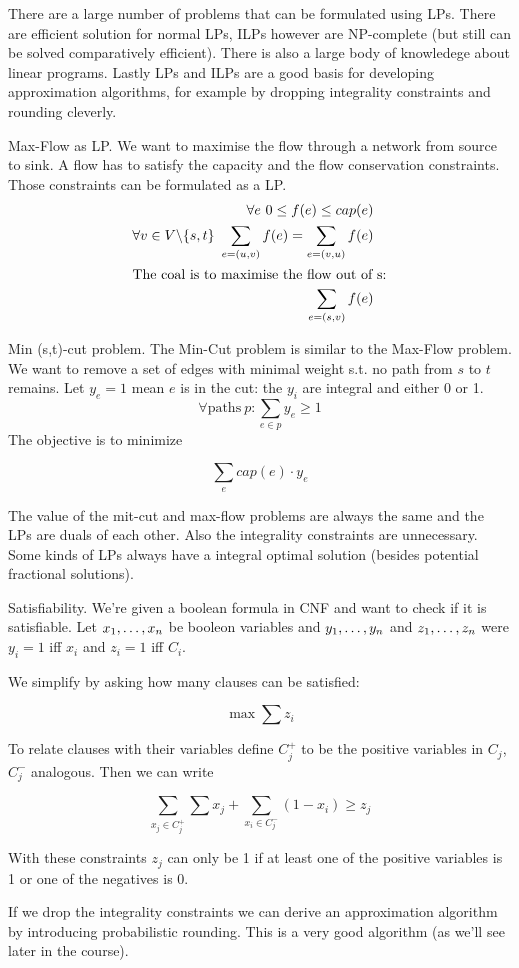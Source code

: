 \begin{itemize}
There are a large number of problems that can be formulated using LPs. There are efficient solution for normal LPs, ILPs however are NP-complete (but still can be solved comparatively efficient). There is also a large body of knowledege about linear programs. Lastly LPs and ILPs are a good basis for developing approximation algorithms, for example by dropping integrality constraints and rounding cleverly.

\begin{Ex}{Max-Flow as LP.} We want to maximise the flow through a network from source to sink. A flow has to satisfy the capacity and the flow conservation constraints. Those constraints can be formulated as a LP.
\begin{align*}
\forall e\ 0\leq f(e)\leq cap(e)\\
\forall v\in V\backslash \{s,t\}\ \sum_{e=(u,v)} f(e) = \sum_{e=(v,u)} f(e)\\
\intertext{The coal is to maximise the flow out of s:}
\sum_{e=(s,v)} f(e)
\end{align*}
\end{Ex}

\begin{Ex}{Min (s,t)-cut problem.} The Min-Cut problem is similar to the Max-Flow problem. We want to remove a set of edges with minimal weight s.t. no path from $s$ to $t$ remains. Let $y_e=1$ mean $e$ is in the cut: the $y_i$ are integral and either 0 or 1.
\[\forall \mbox{paths}\ p: \sum_{e\in p} y_e \geq 1\]
The objective is to minimize 

\[\sum_e cap(e)\cdot y_e\]

The value of the mit-cut and max-flow problems are always the same and the LPs are duals of each other. Also the integrality constraints are unnecessary. Some kinds of LPs always have a integral optimal solution (besides potential fractional solutions).
\end{Ex}

\begin{Ex}{Satisfiability.} We're given a boolean formula in CNF and want to check if it is satisfiable. Let ${x}_1,\ldots,{x}_n$ be booleon variables and ${y}_1,\ldots,{y}_n$ and ${z}_1,\ldots,{z}_n$ were $y_i=1$ iff $x_i$ and $z_i=1$ iff $C_i$.

We simplify by asking how many clauses can be satisfied:

\[\max \sum z_i\]

To relate clauses with their variables define $C_j^+$ to be the positive variables in $C_j$, $C_j^-$ analogous. Then we can write 

\[\sum_{x_j\in C_j^+} \sum x_j + \sum_{x_i \in C_j^-} (1-x_i) \geq z_j\]

With these constraints $z_j$ can only be 1 if at least one of the positive variables is 1 or one of the negatives is 0.

If we drop the integrality constraints we can derive an approximation algorithm by introducing probabilistic rounding. This is a very good algorithm (as we'll see later in the course).
\end{Ex}
\end{itemize}